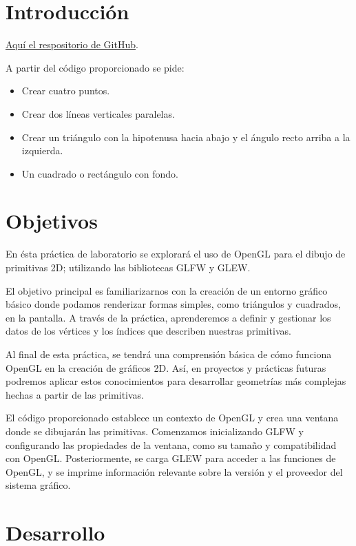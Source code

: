 \documentclass[a4paper,11pt]{article}                 %
\begin{document}
\newpage  
\tableofcontents                                    %


\section{Introducción}
\href{https://github.com/ramen-root/CGIHC}{Aquí el respositorio de GitHub}.

A partir del código proporcionado se pide:
\begin{itemize}
    \item Crear cuatro puntos.
    \item Crear dos líneas verticales paralelas.
    \item Crear un triángulo con la hipotenusa hacia abajo y el ángulo recto arriba a la izquierda.
    \item Un cuadrado o rectángulo con fondo.
\end{itemize}



\section{Objetivos}
En ésta práctica de laboratorio se explorará el uso de OpenGL para el dibujo de primitivas 2D; utilizando las bibliotecas GLFW y GLEW.

El objetivo principal es familiarizarnos con la creación de un entorno gráfico básico donde podamos renderizar formas simples, como triángulos y cuadrados, en la pantalla. A través de la práctica, aprenderemos a definir y gestionar los datos de los vértices y los índices que describen nuestras primitivas.

Al final de esta práctica, se tendrá una comprensión básica de cómo funciona OpenGL en la creación de gráficos 2D. Así, en proyectos y prácticas futuras podremos aplicar estos conocimientos para desarrollar geometrías más complejas hechas a partir de las primitivas.

El código proporcionado establece un contexto de OpenGL y crea una ventana donde se dibujarán las primitivas. Comenzamos inicializando GLFW y configurando las propiedades de la ventana, como su tamaño y compatibilidad con OpenGL. Posteriormente, se carga GLEW para acceder a las funciones de OpenGL, y se imprime información relevante sobre la versión y el proveedor del sistema gráfico. 


\section{Desarrollo}
\end{document}
